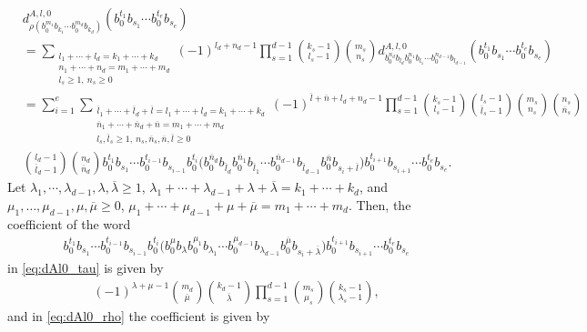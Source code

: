 \documentclass[12pt,reqno]{amsart}
\numberwithin{equation}{section}
\theoremstyle{definition}
\newcommand{\derlzero}[1]{d_{#1}^{A,l,0}}
\begin{document}
\begin{align} \label{eq:dAl0_rho}
&\derlzero{\rho(b_0^{m_1}b_{k_1}\cdots b_0^{m_d}b_{k_d})}(b_0^{t_1}b_{s_1}\cdots b_0^{t_e}b_{s_e}) \nonumber\\
&=\sum_{\substack{l_1+\cdots+l_d=k_1+\cdots+k_d \\ n_1+\cdots+n_d=m_1+\cdots+m_d \\ l_s\geq1,\ n_s\geq0}} (-1)^{l_d+n_d-1}\prod_{s=1}^{d-1} \binom{k_s-1}{l_s-1} \binom{m_s}{n_s} \derlzero{b_0^{n_d}b_{l_d}b_0^{n_1}b_{l_1}\cdots b_0^{n_{d-1}}b_{l_{d-1}}}(b_0^{t_1}b_{s_1}\cdots b_0^{t_e}b_{s_e}) \nonumber\\
&= \sum_{i=1}^e \sum_{\substack{\overline{l}_1+\cdots+\overline{l}_d+\overline{l}=l_1+\cdots+l_d=k_1+\cdots+k_d \\ \overline{n}_1+\cdots+\overline{n}_d+\overline{n}=m_1+\cdots+m_d \\ l_s,\overline{l}_s\geq1,\ n_s,\overline{n}_s,\overline{n},\overline{l}\geq0}} (-1)^{\overline{l}+\overline{n}+l_d+n_d-1} \prod_{s=1}^{d-1}  \binom{k_s-1}{l_s-1} \binom{l_s-1}{\overline{l}_s-1} \binom{m_s}{n_s} \binom{n_s}{\overline{n}_s} \\
& \binom{l_d-1}{\overline{l}_d-1}\binom{n_d}{\overline{n}_d} b_0^{t_1}b_{s_1}\cdots b_0^{t_{i-1}}b_{s_{i-1}}b_0^{t_i}\big(b_0^{\overline{n}_d}b_{\overline{l}_d}b_0^{\overline{n}_1}b_{\overline{l}_1}\cdots b_0^{\overline{n}_{d-1}}b_{\overline{l}_{d-1}}b_0^{\overline{n}}b_{s_i+\overline{l}}\big) b_0^{t_{i+1}}b_{s_{i+1}}\cdots b_0^{t_e}b_{s_e}. \nonumber
\end{align}
Let $\lambda_1,\cdots,\lambda_{d-1},\lambda,\overline{\lambda} \geq 1$, $\lambda_1+\cdots+\lambda_{d-1}+\lambda+\overline{\lambda}=k_1+\cdots+k_d$, and $\mu_1,\ldots,\mu_{d-1},\mu,\overline{\mu}\geq0$, $\mu_1+\cdots+\mu_{d-1}+\mu+\overline{\mu}=m_1+\cdots+m_d$. Then, the coefficient of the word
\begin{align*}
b_0^{t_1}b_{s_1}\cdots b_0^{t_{i-1}}b_{s_{i-1}}b_0^{t_i}\big(b_0^{\mu}b_{\lambda}b_0^{\mu_1}b_{\lambda_1}\cdots b_0^{\mu_{d-1}}b_{\lambda_{d-1}}b_0^{\overline{\mu}}b_{s_i+\overline{\lambda}}\big)b_0^{t_{i+1}}b_{s_{i+1}}\cdots b_0^{t_e}b_{s_e}
\end{align*}
in \eqref{eq:dAl0_tau} is given by
\begin{align} \label{eq:dAl0_coeff1}
(-1)^{\lambda+\mu-1} \binom{m_d}{\overline{\mu}}\binom{k_d-1}{\overline{\lambda}}\prod_{s=1}^{d-1} \binom{m_s}{\mu_s}\binom{k_s-1}{\lambda_s-1},
\end{align}
and in \eqref{eq:dAl0_rho} the coefficient is given by
\end{document}
